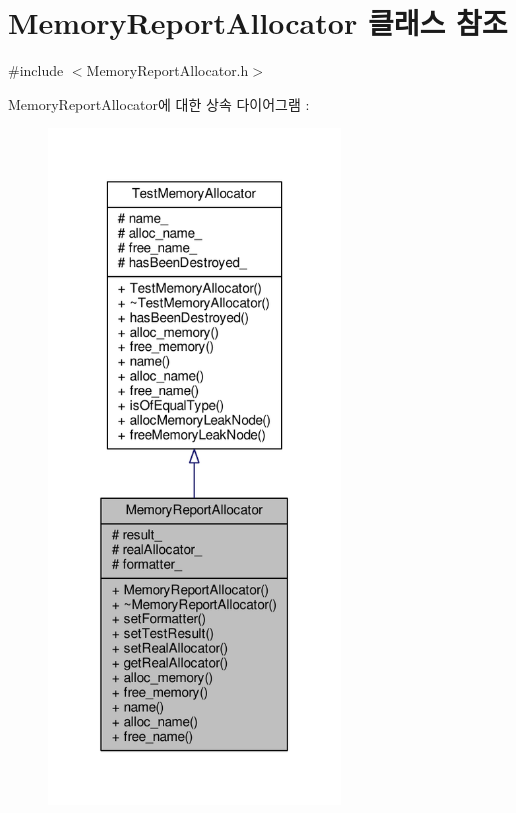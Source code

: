 \hypertarget{class_memory_report_allocator}{}\section{Memory\+Report\+Allocator 클래스 참조}
\label{class_memory_report_allocator}


{\ttfamily \#include $<$Memory\+Report\+Allocator.\+h$>$}



Memory\+Report\+Allocator에 대한 상속 다이어그램 \+: 
\nopagebreak
\begin{figure}[H]
\begin{center}
\leavevmode
\includegraphics[width=220pt]{class_memory_report_allocator__inherit__graph}
\end{center}
\end{figure}


